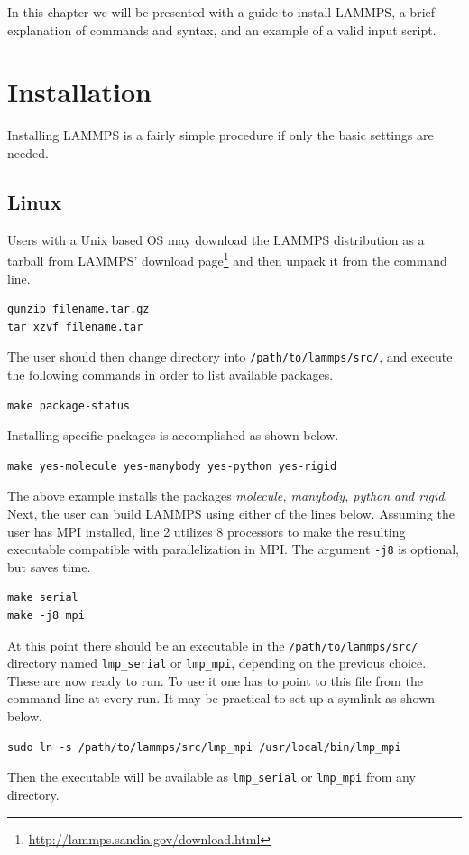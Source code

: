 \documentclass[twoside,english]{uiofysmaster}
\begin{document}
In this chapter we will be presented with a guide to install LAMMPS, a brief explanation of commands and syntax, and an example of a valid input script.
\section{Installation}
Installing LAMMPS is a fairly simple procedure if only the basic settings are needed.

\subsection{Linux}
Users with a Unix based OS may download the LAMMPS distribution as a tarball from LAMMPS' download page\footnote{\href{http://lammps.sandia.gov/download.html}{http://lammps.sandia.gov/download.html}} and then unpack it from the command line.
\begin{lstlisting}
gunzip filename.tar.gz
tar xzvf filename.tar
\end{lstlisting}
The user should then change directory into \texttt{/path/to/lammps/src/}, and execute the following commands in order to list available packages. 
\begin{lstlisting}
make package-status
\end{lstlisting}
Installing specific packages is accomplished as shown below.
\begin{lstlisting}
make yes-molecule yes-manybody yes-python yes-rigid 
\end{lstlisting}
The above example installs the packages \textit{molecule, manybody, python and rigid}.
Next, the user can build LAMMPS using either of the lines below. 
Assuming the user has MPI installed, line 2 utilizes 8 processors to make the resulting executable compatible with parallelization in MPI. The argument \texttt{-j8} is optional, but saves time.
\begin{lstlisting}
make serial
make -j8 mpi
\end{lstlisting}
At this point there should be an executable in the \texttt{/path/to/lammps/src/} directory named \texttt{lmp\_serial} or \texttt{lmp\_mpi}, depending on the previous choice. These are now ready to run.
To use it one has to point to this file from the command line at every run. It may be practical to set up a symlink as shown below.
\begin{lstlisting}
sudo ln -s /path/to/lammps/src/lmp_mpi /usr/local/bin/lmp_mpi
\end{lstlisting}
Then the executable will be available as \texttt{lmp\_serial} or \texttt{lmp\_mpi} from any directory. 
\end{document}

